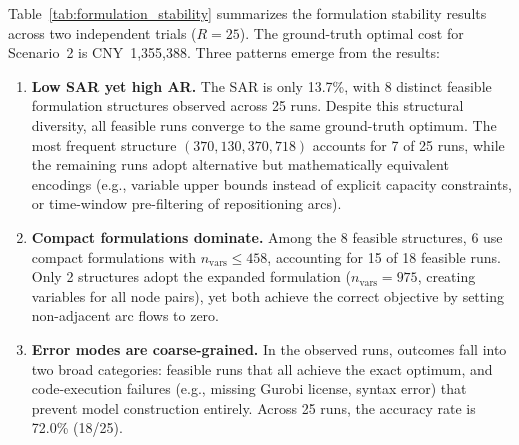 \documentclass[preprint,12pt]{elsarticle}
\begin{document}
Table~\ref{tab:formulation_stability} summarizes the formulation stability results across two independent trials ($R{=}25$). The ground-truth optimal cost for Scenario~2 is CNY~1,355,388. Three patterns emerge from the results:

\begin{enumerate}
    \item \textbf{Low SAR yet high AR.} The SAR is only 13.7\%, with 8 distinct feasible formulation structures observed across 25 runs. Despite this structural diversity, all feasible runs converge to the same ground-truth optimum. The most frequent structure $(370, 130, 370, 718)$ accounts for 7 of 25 runs, while the remaining runs adopt alternative but mathematically equivalent encodings (e.g., variable upper bounds instead of explicit capacity constraints, or time-window pre-filtering of repositioning arcs).

    \item \textbf{Compact formulations dominate.} Among the 8 feasible structures, 6 use compact formulations with $n_{\text{vars}} \leq 458$, accounting for 15 of 18 feasible runs. Only 2 structures adopt the expanded formulation ($n_{\text{vars}} = 975$, creating variables for all node pairs), yet both achieve the correct objective by setting non-adjacent arc flows to zero.

    \item \textbf{Error modes are coarse-grained.} In the observed runs, outcomes fall into two broad categories: feasible runs that all achieve the exact optimum, and code-execution failures (e.g., missing Gurobi license, syntax error) that prevent model construction entirely. Across 25 runs, the accuracy rate is 72.0\% (18/25).
\end{enumerate}
\end{document}
